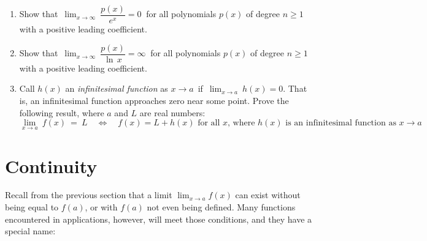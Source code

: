 {\begin{enumerate}[item-label={\bfseries \arabic*.}]
 \begin{enumerate}[item-label={\bfseries (a)}]
  \item Evaluate $\displaystyle\lim_{\beta \to 1-}~\gamma~$. What is the
  physical interpretation of this limit?
  \item Suppose an astronaut and his twin just turned 30 years old when the
  astronaut leaves earth on a high-speed journey through space. Upon returning
  to earth the astronaut is 35 and his twin is 70. At roughly what fraction of
  the speed of light must the astronaut have been traveling?
 \end{enumerate}
 \item Show that $\,\displaystyle\lim_{x \to \infty} ~\dfrac{p(x)}{e^x} = 0~$
 for all polynomials $p(x)$ of degree $n \ge 1$ with a positive leading
 coefficient.
 \item Show that $\,\displaystyle\lim_{x \to \infty} ~\dfrac{p(x)}{\ln\,x} = \infty~$
 for all polynomials $p(x)$ of degree $n \ge 1$ with a positive leading
 coefficient.
 \item Call $h(x)$ an
 \emph{infinitesimal function} as
 $x \to a\,$ if $\,\displaystyle\lim_{x \to a} ~h(x) = 0$. That is, an
 infinitesimal function approaches zero near some point. Prove the following
 result, where $a$ and $L$ are real numbers:
\[
\lim_{x \to a}~f(x) ~=~ L \quad\Leftrightarrow\quad f(x) = L + h(x) \text{ for all $x$, where $h(x)$ is an
infinitesimal function as $x \to a$}
\]
\end{enumerate}}
\newpage
\section{Continuity}
Recall from the previous section that a limit $\lim_{x \to a} f(x)$ can exist
without being equal to $f(a)$, or with $f(a)$ not even being defined. Many
functions encountered in applications, however, will meet those conditions, and
they have a special name:

